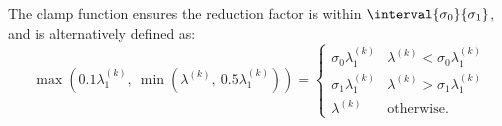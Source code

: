 \documentclass{article}
\begin{document}
The clamp function ensures the reduction factor is within \(\interval{\sigma_0}{\sigma_1}\),
and is alternatively defined as:
\begin{equation*}
    \max{\left( 0.1 \lambda_1^{\left( k \right)},\: \min{\left( \lambda^{\left( k \right)},\: 0.5 \lambda_1^{\left( k \right)} \right)} \right)} =
    \begin{cases}
        \sigma_0 \lambda_1^{\left( k \right)} & \lambda^{\left( k \right)} < \sigma_0 \lambda_1^{\left( k \right)} \\
        \sigma_1 \lambda_1^{\left( k \right)} & \lambda^{\left( k \right)} > \sigma_1 \lambda_1^{\left( k \right)} \\
        \lambda^{\left( k \right)}            & \text{otherwise}.
    \end{cases}
\end{equation*}
\end{document}
